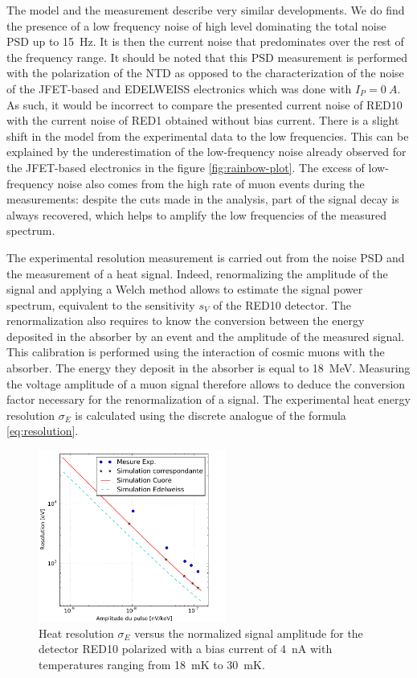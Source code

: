 The model and the measurement describe very similar developments. We do find the presence of a low frequency noise of high level dominating the total noise PSD up to \SI{15}{\Hz}. It is then the current noise that predominates over the rest of the frequency range.
It should be noted that this PSD measurement is performed with the polarization of the NTD as opposed to the characterization of the noise of the JFET-based and EDELWEISS electronics which was done with $I_P = \SI{0}{A}$. As such, it would be incorrect to compare the presented current noise of RED10 with the current noise of RED1 obtained without bias current.
There is a slight shift in the model from the experimental data to the low frequencies. This can be explained by the underestimation of the low-frequency noise already observed for the JFET-based electronics in the figure \ref{fig:rainbow-plot}. The excess of low-frequency noise also comes from the high rate of muon events during the measurements: despite the cuts made in the analysis, part of the signal decay is always recovered, which helps to amplify the low frequencies of the measured spectrum.

The experimental resolution measurement is carried out from the noise PSD and the measurement of a heat signal. Indeed, renormalizing the amplitude of the signal and applying a Welch method allows to estimate the signal power spectrum, equivalent to the sensitivity $s_V$ of the RED10 detector. The renormalization also requires to know the conversion between the energy deposited in the absorber by an event and the amplitude of the measured signal. This calibration is performed using the interaction of cosmic muons with the absorber. The energy they deposit in the absorber is equal to \SI{18}{\mega\eV}. Measuring the voltage amplitude of a muon signal therefore allows to deduce the conversion factor necessary for the renormalization of a signal. The experimental heat energy resolution $\sigma_E$ is calculated using the discrete analogue of the formula \ref{eq:resolution}.

\begin{figure}[!ht]
\begin{center}
\includegraphics[width=0.55\textwidth]{Figures/Ethem/resamp_fin_fin.pdf}
\end{center}
\caption{Heat resolution $\sigma_E$ versus the normalized signal amplitude for the detector RED10 polarized with a bias current of \SI{4}{\nano\ampere}  with temperatures ranging from \SI{18}{\milli\kelvin} to \SI{30}{\milli\kelvin}.}
\label{fig:amp-res-red10}
\end{figure}

